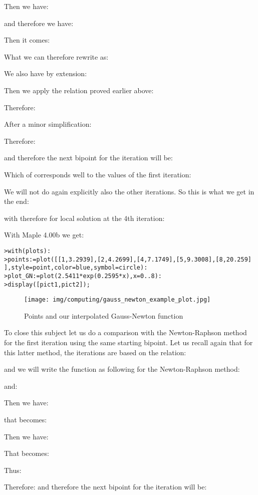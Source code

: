 	Then we have:
	
	and therefore we have:
	
	Then it comes:
	
	What we can therefore rewrite as:
	
	We also have by extension:
	
	Then we apply the relation proved earlier above:
	
	Therefore:
	
	After a minor simplification:
	
	Therefore:
	
	and therefore the next bipoint for the iteration will be:
	
	Which of corresponds well to the values of the first iteration:
	
	We will not do again explicitly also the other iterations. So this is what we get in the end:
	
	with therefore for local solution at the 4th iteration:
	
	With Maple 4.00b we get:
	
	\texttt{>with(plots):}\\
	\texttt{>points:=plot([[1,3.2939],[2,4.2699],[4,7.1749],[5,9.3008],[8,20.259] ],style=point,color=blue,symbol=circle):}\\
	\texttt{>plot\_GN:=plot(2.5411*exp(0.2595*x),x=0..8):}\\	
	\texttt{>display([pict1,pict2]);}
	
	\begin{figure}[H]
		\centering
		\texttt{[image: img/computing/gauss\_newton\_example\_plot.jpg]}
		\caption[]{Points and our interpolated Gauss-Newton function}
	\end{figure}
		
	To close this subject let us do a comparison with the Newton-Raphson method for the first iteration using the same starting bipoint. Let us recall again that for this latter method, the iterations are based on the relation:
	
	and we will write the function as following for the Newton-Raphson method:
	
	and:
	
	Then we have:
	
	that becomes:
	
	Then we have:
	
	That becomes:
	
	Thus:
	
	Therefore:
	and therefore the next bipoint for the iteration will be:
	

